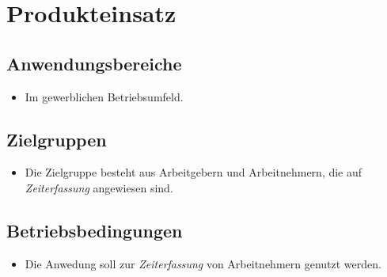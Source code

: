 \section{Produkteinsatz}

\subsection{Anwendungsbereiche}
\begin{itemize}
	\item Im gewerblichen Betriebsumfeld.
\end{itemize}

\subsection{Zielgruppen}
\begin{itemize}
	\item Die Zielgruppe besteht aus Arbeitgebern und Arbeitnehmern, die auf \emph{Zeiterfassung} angewiesen sind.
\end{itemize}

\subsection{Betriebsbedingungen}
\begin{itemize}
	\item Die Anwedung soll zur \emph{Zeiterfassung} von Arbeitnehmern genutzt werden.
\end{itemize}